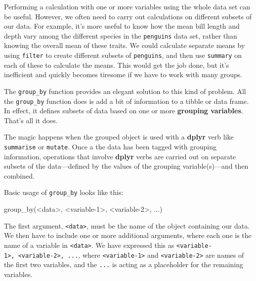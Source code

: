 \documentclass[
]{book}
\newenvironment{Shaded}{\begin{snugshade}}{\end{snugshade}}
\newcommand{\DecValTok}[1]{\textcolor[rgb]{0.00,0.00,0.81}{#1}}
\newcommand{\FunctionTok}[1]{\textcolor[rgb]{0.00,0.00,0.00}{#1}}
\newcommand{\NormalTok}[1]{#1}
\newcommand{\SpecialCharTok}[1]{\textcolor[rgb]{0.00,0.00,0.00}{#1}}
\begin{document}
Performing a calculation with one or more variables using the whole data set can be useful. However, we often need to carry out calculations on different subsets of our data. For example, it's more useful to know how the mean bill length and depth vary among the different species in the \texttt{penguins} data set, rather than knowing the overall mean of these traits. We could calculate separate means by using \texttt{filter} to create different subsets of \texttt{penguins}, and then use \texttt{summary} on each of these to calculate the means. This would get the job done, but it's inefficient and quickly becomes tiresome if we have to work with many groups.

The \texttt{group\_by} function provides an elegant solution to this kind of problem. All the \texttt{group\_by} function does is add a bit of information to a tibble or data frame. In effect, it defines subsets of data based on one or more \textbf{grouping variables}. That's all it does.

The magic happens when the grouped object is used with a \textbf{dplyr} verb like \texttt{summarise} or \texttt{mutate}. Once a the data has been tagged with grouping information, operations that involve \textbf{dplyr} verbs are carried out on separate subsets of the data---defined by the values of the grouping variable(s)---and then combined.

Basic usage of \texttt{group\_by} looks like this:

\begin{Shaded}
\begin{Highlighting}[]
\FunctionTok{group\_by}\NormalTok{(}\SpecialCharTok{\textless{}}\NormalTok{data}\SpecialCharTok{\textgreater{}}\NormalTok{, }\SpecialCharTok{\textless{}}\NormalTok{variable}\DecValTok{{-}1}\SpecialCharTok{\textgreater{}}\NormalTok{, }\SpecialCharTok{\textless{}}\NormalTok{variable}\DecValTok{{-}2}\SpecialCharTok{\textgreater{}}\NormalTok{, ...)}
\end{Highlighting}
\end{Shaded}

The first argument, \texttt{\textless{}data\textgreater{}}, must be the name of the object containing our data. We then have to include one or more additional arguments, where each one is the name of a variable in \texttt{\textless{}data\textgreater{}}. We have expressed this as \texttt{\textless{}variable-1\textgreater{},\ \textless{}variable-2\textgreater{},\ ...}, where \texttt{\textless{}variable-1\textgreater{}} and \texttt{\textless{}variable-2\textgreater{}} are names of the first two variables, and the \texttt{...} is acting as a placeholder for the remaining variables.
\end{document}
